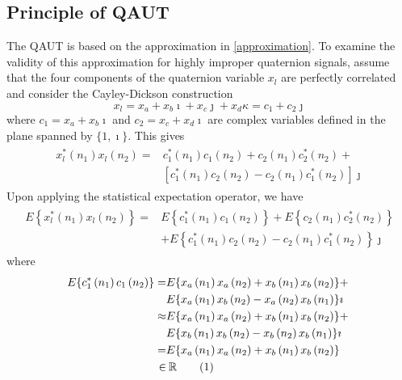 \documentclass[review]{elsarticle}
\theoremstyle{plain}
\theoremstyle{remark}
\theoremstyle{plain}
\theoremstyle{definition}
\theoremstyle{prop}
\theoremstyle{definition}
\theoremstyle{plain}
\theoremstyle{plain}
\newcommand\numberthis{\addtocounter{equation}{1}\tag{\theequation}}
\begin{document}
\subsection{Principle of QAUT}
The QAUT is based on the approximation in \eqref{approximation}. To examine the validity of this approximation for highly improper quaternion signals, assume that the four components of the quaternion variable $x_l$ are perfectly correlated and consider the Cayley-Dickson construction \cite{Ward1997} \[x_l=x_{a}+x_{b} \imath + x_{c} \jmath+x_{d} \kappa =c_{1}+c_{2}\jmath\]
where $c_{1}=x_{a}+x_{b} \imath $ and $c_{2}=x_{c}+x_{d} \imath $ are complex variables defined in the plane spanned by $\{1,\imath\}$. This gives
\begin{align}
\begin{array}{rl}
\!\!\!\!\!x^{*}_l\left(n_1\right)x_l\left(n_2\right)=\!\!&\!\!c_{1}^{*}\left(n_1\right)c_{1}\left(n_2\right)+c_{2}\left(n_1\right)c_{2}^{*}\left(n_2\right)+\\&\!\!\left[c_{1}^{*}\left(n_1\right)c_{2}\left(n_2\right)-c_{2}\left(n_1\right)c_{1}^{*}\left(n_2\right)\right]\jmath
\end{array}\label{x_k*x_l-original}
\end{align}
Upon applying the statistical expectation operator, we have
\begin{align}
\begin{array}{rl}
\!\!\!\!\!\!E\left\{x^{*}_l\left(n_1\right)x_l\left(n_2\right)\right\}=&E\left\{ c_{1}^{*}\left(n_1\right)c_{1}\left(n_2\right)\right\}+E\left\{ c_{2}\left(n_1\right)c_{2}^{*}\left(n_2\right)\right\}\\&+E\left\{ c_{1}^{*}\left(n_1\right)c_{2}\left(n_2\right)-c_{2}\left(n_1\right)c_{1}^{*}\left(n_2\right)\right\} \jmath 
\end{array}\label{x_k*x_l}
\end{align}
where
\begin{align*}
\!\!E\{c_{1}^{*}\left(n_1\right)c_{1}\left(n_2\right)\}=&E\{x_a\left(n_1\right)x_a\left(n_2\right)+x_b\left(n_1\right)x_b\left(n_2\right)\}+\\
&E\{x_a\left(n_1\right)x_b\left(n_2\right)-x_a\left(n_2\right)x_b\left(n_1\right)\}\imath\\
\approx&E\{x_a\left(n_1\right)x_a\left(n_2\right)+x_b\left(n_1\right)x_b\left(n_2\right)\}+\\
&E\{x_b\left(n_1\right)x_b\left(n_2\right)-x_b\left(n_2\right)x_b\left(n_1\right)\}\imath\\
=&E\{x_a\left(n_1\right)x_a\left(n_2\right)+x_b\left(n_1\right)x_b\left(n_2\right)\}\\\in & \: \mathbb{R}\numberthis
\end{align*}
\end{document}
